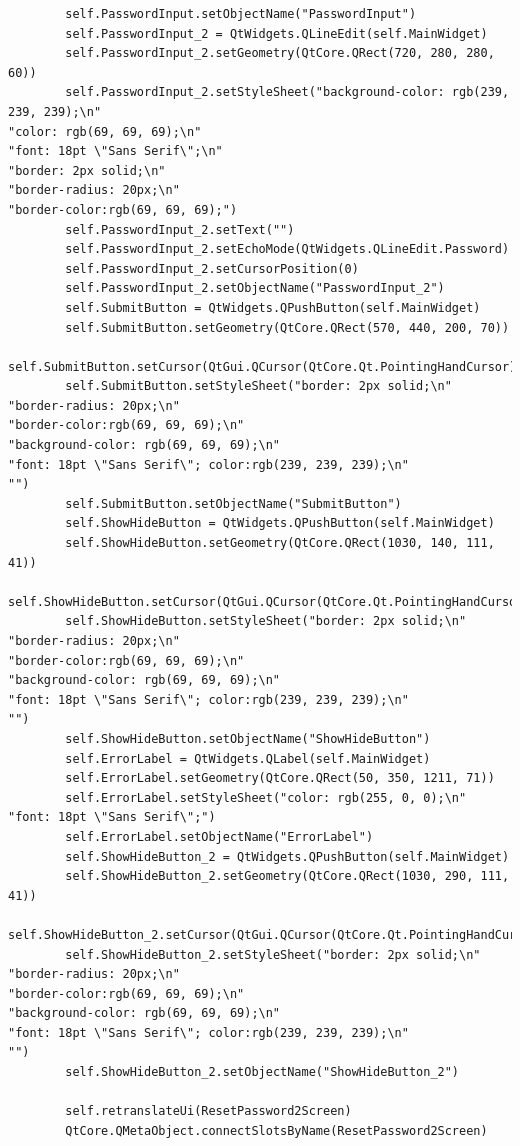 \documentclass{article}
\begin{document}
\begin{lstlisting}
        self.PasswordInput.setObjectName("PasswordInput")
        self.PasswordInput_2 = QtWidgets.QLineEdit(self.MainWidget)
        self.PasswordInput_2.setGeometry(QtCore.QRect(720, 280, 280, 60))
        self.PasswordInput_2.setStyleSheet("background-color: rgb(239, 239, 239);\n"
"color: rgb(69, 69, 69);\n"
"font: 18pt \"Sans Serif\";\n"
"border: 2px solid;\n"
"border-radius: 20px;\n"
"border-color:rgb(69, 69, 69);")
        self.PasswordInput_2.setText("")
        self.PasswordInput_2.setEchoMode(QtWidgets.QLineEdit.Password)
        self.PasswordInput_2.setCursorPosition(0)
        self.PasswordInput_2.setObjectName("PasswordInput_2")
        self.SubmitButton = QtWidgets.QPushButton(self.MainWidget)
        self.SubmitButton.setGeometry(QtCore.QRect(570, 440, 200, 70))
        self.SubmitButton.setCursor(QtGui.QCursor(QtCore.Qt.PointingHandCursor))
        self.SubmitButton.setStyleSheet("border: 2px solid;\n"
"border-radius: 20px;\n"
"border-color:rgb(69, 69, 69);\n"
"background-color: rgb(69, 69, 69);\n"
"font: 18pt \"Sans Serif\"; color:rgb(239, 239, 239);\n"
"")
        self.SubmitButton.setObjectName("SubmitButton")
        self.ShowHideButton = QtWidgets.QPushButton(self.MainWidget)
        self.ShowHideButton.setGeometry(QtCore.QRect(1030, 140, 111, 41))
        self.ShowHideButton.setCursor(QtGui.QCursor(QtCore.Qt.PointingHandCursor))
        self.ShowHideButton.setStyleSheet("border: 2px solid;\n"
"border-radius: 20px;\n"
"border-color:rgb(69, 69, 69);\n"
"background-color: rgb(69, 69, 69);\n"
"font: 18pt \"Sans Serif\"; color:rgb(239, 239, 239);\n"
"")
        self.ShowHideButton.setObjectName("ShowHideButton")
        self.ErrorLabel = QtWidgets.QLabel(self.MainWidget)
        self.ErrorLabel.setGeometry(QtCore.QRect(50, 350, 1211, 71))
        self.ErrorLabel.setStyleSheet("color: rgb(255, 0, 0);\n"
"font: 18pt \"Sans Serif\";")
        self.ErrorLabel.setObjectName("ErrorLabel")
        self.ShowHideButton_2 = QtWidgets.QPushButton(self.MainWidget)
        self.ShowHideButton_2.setGeometry(QtCore.QRect(1030, 290, 111, 41))
        self.ShowHideButton_2.setCursor(QtGui.QCursor(QtCore.Qt.PointingHandCursor))
        self.ShowHideButton_2.setStyleSheet("border: 2px solid;\n"
"border-radius: 20px;\n"
"border-color:rgb(69, 69, 69);\n"
"background-color: rgb(69, 69, 69);\n"
"font: 18pt \"Sans Serif\"; color:rgb(239, 239, 239);\n"
"")
        self.ShowHideButton_2.setObjectName("ShowHideButton_2")

        self.retranslateUi(ResetPassword2Screen)
        QtCore.QMetaObject.connectSlotsByName(ResetPassword2Screen)


\end{lstlisting}
\end{document}

